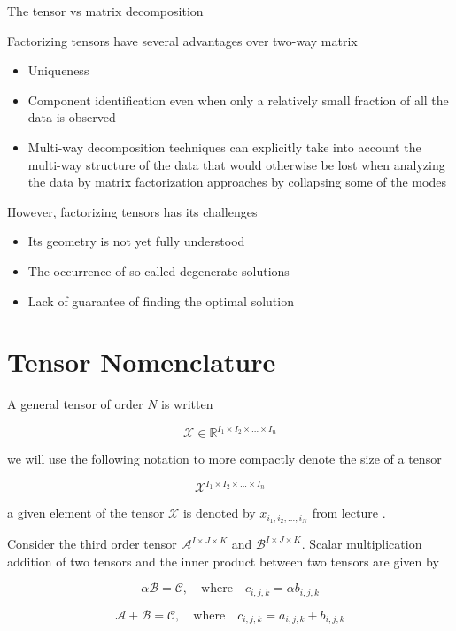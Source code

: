 The tensor vs matrix decomposition

Factorizing tensors have several advantages over two-way matrix

\begin{itemize}
  \item Uniqueness
  \item Component identification even when only a relatively small fraction of all the data is observed
  \item Multi-way decomposition techniques can explicitly take into account the multi-way structure of the data that would otherwise be lost when analyzing the data by matrix factorization approaches by collapsing some of the modes
\end{itemize}

However, factorizing tensors has its challenges

\begin{itemize}
  \item Its geometry is not yet fully understood
  \item The occurrence of so-called degenerate solutions
  \item Lack of guarantee of finding the optimal solution
\end{itemize}

\section{Tensor Nomenclature}

A general tensor of order $N$ is written

\[
    \mathcal{X} \in \mathbb{R}^{I_1 \times I_2 \times ... \times I_n}
\]

we will use the following notation to more compactly denote the size of a tensor

\[
    \mathcal{X}^{I_1 \times I_2 \times ... \times I_n}
\]

a given element of the tensor $\mathcal{X}$ is denoted by $x_{i_1, i_2, ..., i_N}$ from lecture \cite[p.~10]{lecture11}.

Consider the third order tensor $\mathcal{A}^{I \times J \times K}$ and $\mathcal{B}^{I \times J \times K}$. Scalar multiplication addition of two tensors and the inner product between two tensors are given by

\[
    \alpha \mathcal{B} = \mathcal{C}, \quad \text{where} \quad c_{i,j,k} = \alpha b_{i,j,k}
\]

\[
    \mathcal{A} + \mathcal{B} = \mathcal{C}, \quad \text{where} \quad c_{i,j,k} = a_{i,j,k} + b_{i,j,k}
\]

